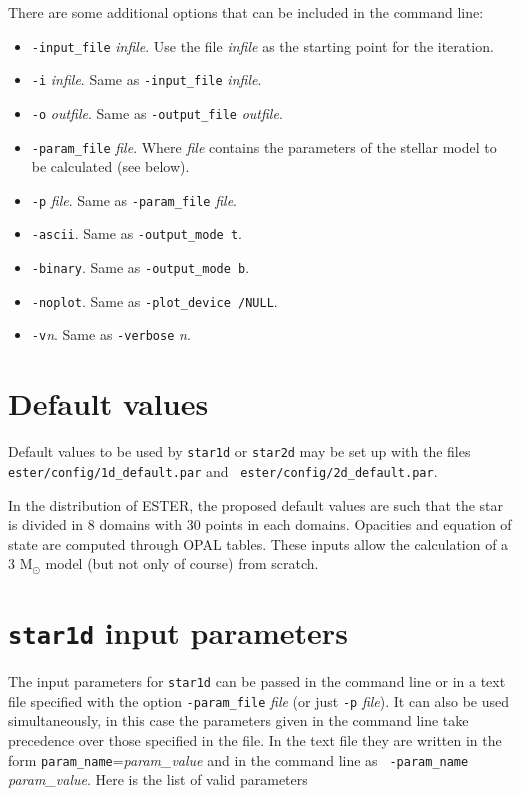 There are some additional options that can be included in the command line:
\begin{itemize}
\item[] {\tt -input\_file} {\it infile}. Use the file {\it infile} as the starting point
for the iteration.
\item[] {\tt -i} {\it infile}. Same as {\tt -input\_file} {\it infile}.
\item[] {\tt -o} {\it outfile}. Same as {\tt -output\_file} {\it outfile}.
\item[] {\tt -param\_file} {\it file}. Where {\it file} contains the parameters of the 
stellar model to be calculated (see below).
\item[] {\tt -p} {\it file}. Same as {\tt -param\_file} {\it file}.
\item[] {\tt -ascii}. Same as {\tt -output\_mode t}.
\item[] {\tt -binary}. Same as {\tt -output\_mode b}.
\item[] {\tt -noplot}. Same as {\tt -plot\_device /NULL}.
\item[] {\tt -v}{\it n}. Same as {\tt -verbose} {\it n}.
\end{itemize}

\section{Default values}

Default values to be used by {\tt star1d} or {\tt star2d} may be set up
with the files {\tt ester/config/1d\_default.par} and {\tt
ester/config/2d\_default.par}.

In the distribution of ESTER, the proposed default values are such that
the star is divided in 8 domains with 30 points in
each domains. Opacities and equation of state
are computed through OPAL tables. These inputs allow the calculation of
a 3 M$_\odot$ model (but not only of course) from scratch.

\section{{\tt star1d} input parameters}

The input parameters for {\tt star1d} can be passed in the command line
or in a text file specified with the option {\tt -param\_file} {\it file}
(or just {\tt -p} {\it file}). It can also be used simultaneously, in
this case the parameters given in the command line take precedence over
those specified in the file. In the text file they are written in the
form {\tt param\_name}={\it param\_value} and in the command line as {\tt
-param\_name} {\it param\_value}.  Here is the list of valid parameters

